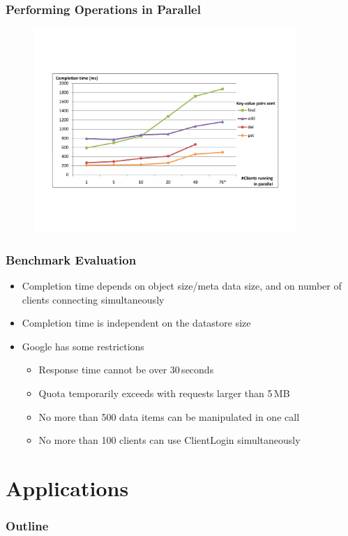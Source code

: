 \documentclass{beamer}
\begin{document}
\frame
{
	\frametitle{Performing Operations in Parallel}
	\begin{figure}[t]
	\begin{center}
	\includegraphics[trim=4cm 4cm 4cm 5cm, width=10cm]{parallel.pdf} 
	\end{center}
	\end{figure}
}

\frame
{
	\frametitle{Benchmark Evaluation}
	\begin{itemize}
    	\item Completion time depends on object size/meta data size, and on number
    		of clients connecting simultaneously
    	\item Completion time is independent on the datastore size
    	\item Google has some restrictions
		\begin{itemize}
    		\item Response time cannot be over 30\,seconds
    		\item Quota temporarily exceeds with requests larger than 5\,MB
    		\item No more than 500 data items can be manipulated in one call
    		\item No more than 100 clients can use ClientLogin simultaneously
    	\end{itemize}
    \end{itemize}
}

\section{Applications}
\frame
{
	\frametitle{Outline}
	\tableofcontents[currentsection]
}
\end{document}
